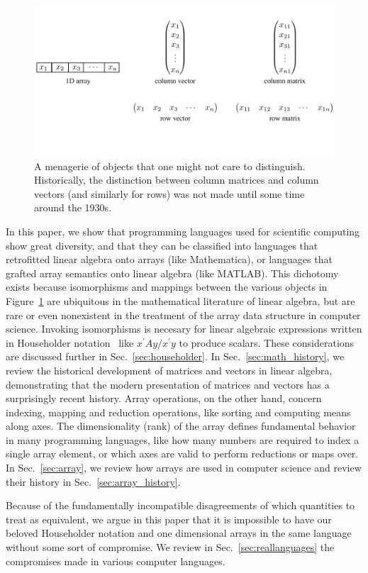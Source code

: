 \begin{figure}
\label{fig:zoo}
\caption{A menagerie of objects that one might not care to distinguish. Historically,
the distinction between column matrices and column vectors (and similarly
for rows) was not made until some time around the 1930s.}

\begin{centering}
\includegraphics[width=0.95\columnwidth]{figures/fig-zoo}
\par\end{centering}
\end{figure}

In this paper, we show that programming languages used for scientific computing show great diversity, and that they can be classified into languages that retrofitted linear algebra onto arrays (like Mathematica), or languages that grafted array semantics onto linear algebra (like MATLAB). This dichotomy exists because isomorphisms and mappings between the various objects in Figure~\ref{fig:zoo} are ubiquitous in the mathematical literature of linear algebra, but are rare or even nonexistent in the treatment of the array data structure in computer science. Invoking isomorphisms is necesary for linear algebraic expressions written in Householder notation~\cite{Householder1953,Householder1955} like $x^\prime Ay/x^\prime y$ to produce scalars. These considerations are discussed further in Sec.~\ref{sec:householder}. In Sec.~\ref{sec:math_history}, we review the historical development of matrices and vectors in linear algebra, demonstrating that the modern presentation of matrices and vectors has a surprisingly recent history. Array operations, on the other hand, concern indexing, mapping and reduction operations, like sorting and computing means along axes. The dimensionality (rank) of the array defines fundamental behavior in many programming languages, like how many numbers are required to index a single array element, or which axes are valid to perform reductions or maps over. In Sec.~\ref{sec:array}, we review how arrays are used in computer science and review their history in Sec.~\ref{sec:array_history}.

Because of the fundamentally incompatible disagreements of which quantities to treat as equivalent, we argue in this paper that it is impossible to have our beloved Householder notation and one dimensional arrays in the same language without some sort of compromise. We review in Sec.~\ref{sec:reallanguages} the compromises made in various computer languages.

